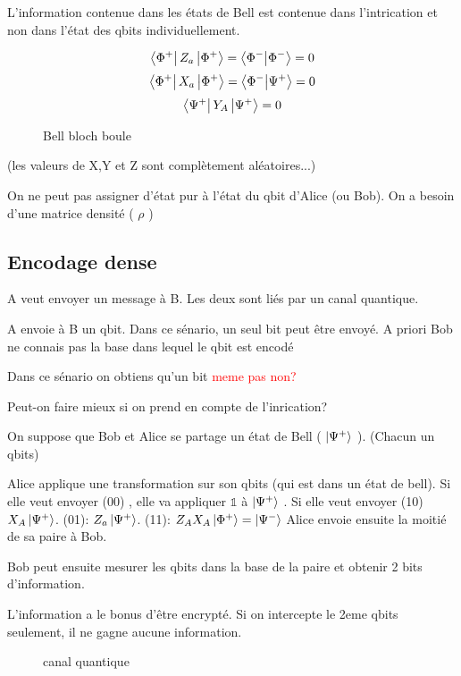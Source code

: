 L'information contenue dans les états de Bell est contenue dans l'intrication et non dans l'état des qbits individuellement. 


$$\bra{\Phi^+} Z_a \ket{\Phi^+} =\bra{\Phi^-} \ket{\Phi^-} =0$$ 
$$\bra{\Phi^+} X_a \ket{\Phi^+} =\bra{\Phi^-} \ket{\Psi^+} =0$$ 
$$\bra{\Psi^+} Y_A \ket{\Psi^+} =0$$ 


\begin{figure}[ht]
    \centering
    \caption{Bell bloch boule}
    \label{fig:bell-bloch-boule}
\end{figure}

(les valeurs de X,Y et Z sont complètement aléatoires...)

On ne peut pas assigner d'état pur à l'état du qbit d'Alice (ou Bob). On a besoin d'une matrice densité ( $\rho$  )

\subsection{Encodage dense}

A veut envoyer un message à B. Les deux sont liés par un canal quantique.

A envoie à B un qbit.
Dans ce sénario, un seul bit peut être envoyé. A priori Bob ne connais pas la base dans lequel le qbit est encodé

Dans ce sénario on obtiens qu'un bit \textcolor{red}{meme pas non?}

Peut-on faire mieux si on prend en compte de l'inrication?


On suppose que Bob et Alice se partage un état de Bell ( $\ket{\Psi^+}$  ). (Chacun un qbits)

Alice applique une transformation sur son qbits (qui est dans un état de bell). Si elle veut envoyer (00) , elle va appliquer $\mathds{1}$ à $\ket{\Psi^+}$ . Si elle veut envoyer (10) $X_A \ket{\Psi^+}$. (01): $Z_a \ket{\Psi^+}$. (11): $Z_A X_A \ket{\Phi^+} = \ket{\Psi^-}$ 
Alice envoie ensuite la moitié de sa paire à Bob.

Bob peut ensuite mesurer les qbits dans la base de la paire et obtenir 2 bits d'information.

L'information a le bonus d'être encrypté. Si on intercepte le 2eme qbits seulement, il ne gagne aucune information.

\begin{figure}[ht]
    \centering
    \caption{canal quantique}
    \label{fig:canal-quantique}
\end{figure}

